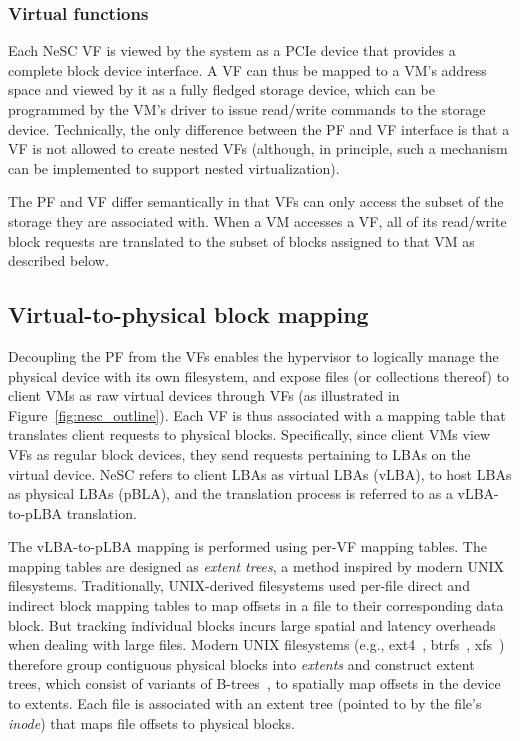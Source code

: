\subsubsection*{Virtual functions}
Each NeSC VF is viewed by the system as a PCIe device that provides a complete block device interface. A VF can thus be mapped to a VM's address space and viewed by it as a fully fledged storage device, which can be programmed by the VM's driver to issue read/write commands to the storage device. Technically, the only difference between the PF and VF interface is that a VF is not allowed to create nested VFs (although, in principle, such a mechanism can be implemented to support nested virtualization).

The PF and VF differ semantically in that VFs can only access the subset of the storage they are associated with. When a VM accesses a VF, all of its read/write block requests are translated to the subset of blocks assigned to that VM as described below.

\subsection{Virtual-to-physical block mapping}

Decoupling the PF from the VFs enables the hypervisor to logically manage the physical device with its own filesystem, and expose files (or collections thereof) to client VMs as raw virtual devices through VFs (as illustrated in Figure~\ref{fig:nesc_outline}). Each VF is thus associated with a mapping table that translates client requests to physical blocks. Specifically, since client VMs view VFs as regular block devices, they send requests pertaining to LBAs on the virtual device. NeSC refers to client LBAs as virtual LBAs (vLBA), to host LBAs as physical LBAs (pBLA), and the translation process is referred to as a vLBA-to-pLBA translation.

The vLBA-to-pLBA mapping is performed using per-VF mapping tables. The mapping tables are designed as \emph{extent trees}, a method inspired by modern UNIX filesystems.
%
Traditionally, UNIX-derived filesystems used per-file direct and indirect  block mapping tables to map offsets in a file to their corresponding data block. But tracking individual blocks incurs large spatial and latency overheads when dealing with large files. Modern UNIX filesystems (e.g., ext4~\cite{mathur07ext4}, btrfs~\cite{rodeh13btrfs}, xfs~\cite{sweeney96xfs}) therefore group contiguous physical blocks into \emph{extents} and construct extent trees, which consist of variants of B-trees~\cite{comer79btree}, to spatially map offsets in the device to extents.
Each file is associated with an extent tree (pointed to by the file's \emph{inode}) that maps file offsets to physical blocks.

